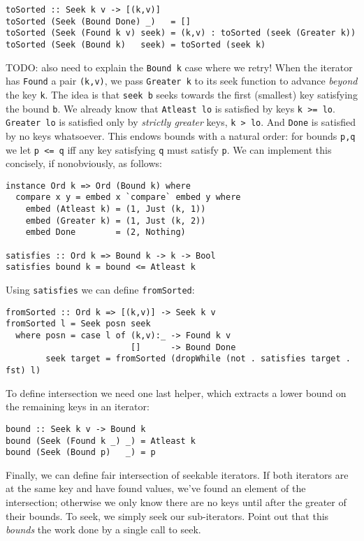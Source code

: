 \documentclass[acmsmall,screen,review,anonymous,dvipsnames,svgnames]{acmart}
\newcommand\hask[1]{\texttt{#1}}
\newcommand\ttt\texttt
\newcommand\todo[1]{{\color{Orange}#1}}
\renewcommand\todo[1]{{\color{IndianRed}#1}}
\begin{document}
\begin{verbatim}
toSorted :: Seek k v -> [(k,v)]
toSorted (Seek (Bound Done) _)   = []
toSorted (Seek (Found k v) seek) = (k,v) : toSorted (seek (Greater k))
toSorted (Seek (Bound k)   seek) = toSorted (seek k)
\end{verbatim}

\noindent
\todo{TODO: also need to explain the \hask{Bound k} case where we retry!}
When the iterator has \hask{Found} a pair \ttt{(k,v)}, we pass \hask{Greater k} to its seek function to advance \emph{beyond} the key \ttt{k}.
The idea is that \ttt{seek b} seeks towards the first (smallest) key satisfying the bound \ttt{b}.
We already know that \hask{Atleast lo} is satisfied by keys \ttt{k >= lo}.
\hask{Greater lo} is satisfied only by \emph{strictly greater} keys, \ttt{k > lo}.
And \hask{Done} is satisfied by no keys whatsoever.
This endows bounds with a natural order: for bounds \ttt{p,q} we let \ttt{p <= q} iff any key satisfying \ttt{q} must satisfy \ttt{p}.
We can implement this concisely, if nonobviously, as follows:

\begin{verbatim}
instance Ord k => Ord (Bound k) where
  compare x y = embed x `compare` embed y where
    embed (Atleast k) = (1, Just (k, 1))
    embed (Greater k) = (1, Just (k, 2))
    embed Done        = (2, Nothing)

satisfies :: Ord k => Bound k -> k -> Bool
satisfies bound k = bound <= Atleast k
\end{verbatim}

\noindent
Using \ttt{satisfies} we can define \ttt{fromSorted}:

\begin{verbatim}
fromSorted :: Ord k => [(k,v)] -> Seek k v
fromSorted l = Seek posn seek
  where posn = case l of (k,v):_ -> Found k v
                         []      -> Bound Done
        seek target = fromSorted (dropWhile (not . satisfies target . fst) l)
\end{verbatim}

\noindent
To define intersection we need one last helper, which extracts a lower bound on the remaining keys in an iterator:

\begin{verbatim}
bound :: Seek k v -> Bound k
bound (Seek (Found k _) _) = Atleast k
bound (Seek (Bound p)   _) = p
\end{verbatim}

\noindent
Finally, we can define fair intersection of seekable iterators.
If both iterators are at the same key and have found values, we've found an element of the intersection; otherwise we only know there are no keys until after the greater of their bounds.
To seek, we simply seek our sub-iterators.
\todo{Point out that this \emph{bounds} the work done by a single call to seek.}
\end{document}
